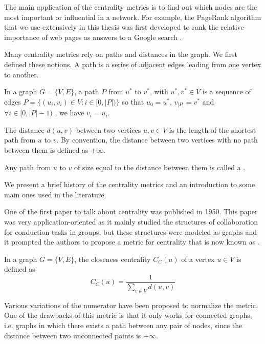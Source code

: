 The main application of the centrality metrics is to find out which nodes are the most important or influential in a network. For example, the PageRank algorithm that we use extensively in this thesis was first developed to rank the relative importance of web pages as answers to a Google search \cite{pagerank}.

Many centrality metrics rely on paths and distances in the graph. We first defined these notions. A path is a series of adjacent edges leading from one vertex to another.
\begin{definition}[Path]
    In a graph $G = \{V, E\}$, a path $P$ from $u^*$ to $v^*$, with $u^*, v^* \in V$ is a sequence of edges $P = \{(u_i, v_i) \in V: i\in [0, |P|)\}$ so that $u_0 = u^*$, $v_{|P|} = v^*$ and $\forall i \in [0, |P|-1)$ , we have $v_i = u_i$.
\end{definition}

\begin{definition}
    The distance $d(u, v)$ between two vertices $u, v \in V$ is the length of the shortest path from $u$ to $v$. By convention, the distance between two vertices with no path between them is defined as $+\infty$. 

    Any path from $u$ to $v$ of size equal to the distance between them is called a .
\end{definition}

We present a brief history of the centrality metrics and an introduction to some main ones used in the literature.

One of the first paper to talk about centrality was \cite{bavelas1950_firstCentrality} published in 1950. This paper was very application-oriented as it mainly studied the structures of collaboration for conduction tasks in groups, but these structures were modeled as graphs and it prompted the authors to propose a metric for centrality that is now known as .
\begin{definition}
    In a graph $G = \{V, E\}$, the closeness centrality $C_C(u)$ of a vertex $u\in V$ is defined as
    \begin{equation}
        C_C(u) = \frac{1}{\sum_{v\in V} d(u, v)}
    \end{equation}
\end{definition}

Various variations of the numerator have been proposed to normalize the metric. One of the drawbacks of this metric is that it only works for connected graphs, i.e. graphs in which there exists a path between any pair of nodes, since the distance between two unconnected points is $+\infty$.

